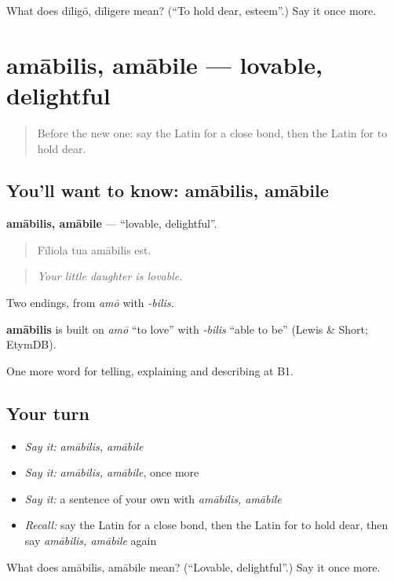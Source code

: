 \begin{tcolorbox}[breakable,colback=teal!4,colframe=teal!35!black,title={Before you move on}]
What does dīligō, dīligere mean? (\textquotedblleft{}To hold dear, esteem\textquotedblright{}.) Say it once more.
\end{tcolorbox}
\section[amābilis, amābile]{amābilis, amābile — lovable, delightful}

\label{lesson:LA-C533-amabilis}



\begin{quote}
Before the new one: say the Latin for a close bond, then the Latin for to hold dear.
\end{quote}

\subsection*{You'll want to know: amābilis, amābile}
\textbf{amābilis, amābile} — \textquotedblleft{}lovable, delightful\textquotedblright{}.

\begin{quote}
Fīliola tua amābilis est.
\end{quote}

\begin{quote}
\emph{Your little daughter is lovable.}
\end{quote}

Two endings, from \emph{amō} with \emph{-bilis}.

\begin{cousinweb}
\textbf{amābilis} is built on \emph{amō} \textquotedblleft{}to love\textquotedblright{} with \emph{-bilis} \textquotedblleft{}able to be\textquotedblright{} (Lewis \& Short; EtymDB).
\end{cousinweb}

\begin{grammarlens}[title={What you've built}]
One more word for telling, explaining and describing at B1.
\end{grammarlens}

\subsection*{Your turn}
\begin{itemize}
\raggedright
  \item \emph{Say it:} \emph{amābilis, amābile}
  \item \emph{Say it:} \emph{amābilis, amābile}, once more
  \item \emph{Say it:} a sentence of your own with \emph{amābilis, amābile}
  \item \emph{Recall:} say the Latin for a close bond, then the Latin for to hold dear, then say \emph{amābilis, amābile} again
\end{itemize}

\begin{tcolorbox}[breakable,colback=teal!4,colframe=teal!35!black,title={Before you move on}]
What does amābilis, amābile mean? (\textquotedblleft{}Lovable, delightful\textquotedblright{}.) Say it once more.
\end{tcolorbox}
